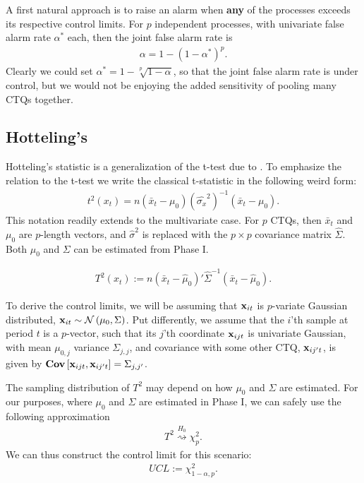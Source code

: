 A first natural approach is to raise an alarm when \textbf{any} of the processes exceeds its respective control limits.
For $p$ independent processes, with univariate false alarm rate $\alpha^*$ each, then the joint false alarm rate is 
\begin{align}
	\alpha = 1-(1-\alpha^*)^p.
\end{align}
Clearly we could set $\alpha^*=1-\sqrt[p]{1-\alpha}$, so that the joint false alarm rate is under control, but we would not be enjoying the added sensitivity of pooling many CTQs together. 



\subsection[Hotteling's T2]{Hotteling's \tsq}
Hotteling's \tsq statistic is a generalization of the t-test due to \cite{hotelling_generalization_1931}.
To emphasize the relation to the t-test we write the classical t-statistic in the following weird form:
\begin{align}
	t^2(x_t)=n (\bar{x}_t-\mu_0) (\hat{\sigma_x}^2)^{-1} (\bar{x}_t-\mu_0).
\end{align}
This notation readily extends to the multivariate case. 
For $p$ CTQs, then $\bar{x}_t$ and $\mu_0$ are $p$-length vectors, and $\hat{\sigma}^2$ is replaced with the $p \times p$ covariance matrix $\hat{\Sigma}$.
Both $\mu_0$ and $\Sigma$ can be estimated from Phase I. 
\begin{definition}
\begin{align}
\label{eq:hotteling}
	T^2(x_t) := n (\bar{x}_t-\hat{\mu}_0)' \hat{\Sigma}^{-1} (\bar{x}_t-\hat{\mu}_0).
\end{align}
\end{definition}
To derive the control limits, we will be assuming that $\mathbf{x}_{it}$ is $p$-variate Gaussian distributed, $\mathbf{x}_{it}\sim \mathcal{N}\left(\mu_0, \Sigma\right)$. 
Put differently, we assume that the $i$'th sample at period $t$ is a $p$-vector, such that its $j$'th coordinate $\mathbf{x}_{ijt}$ is univariate Gaussian, with mean $\mu_{0,j}$ variance $\Sigma_{j,j}$, and covariance with some other CTQ, $\mathbf{x}_{ij't}$, is given by $\mathbf{Cov} \left[ \mathbf{x}_{ijt},\mathbf{x}_{ij't} \right]=\Sigma_{j,j'}$. 

The sampling distribution of $T^2$ may depend on how $\mu_0$ and $\Sigma$ are estimated. 
For our purposes, where $\mu_0$ and $\Sigma$ are estimated in Phase I, we can safely use the following approximation
\begin{align}
	T^2 \overset{H_0}{\rightsquigarrow }\chi^2_p.
\end{align}
We can thus construct the control limit for this scenario:
\begin{align}
	UCL:= \chi^2_{1-\alpha,p}.
\end{align}

